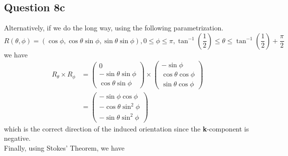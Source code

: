 \documentclass{article}
\begin{document}
\subsection*{Question 8c}
Alternatively, if we do the long way, using the following parametrization.
\[R(\theta, \phi) = (\cos\phi, \cos\theta\sin\phi,\sin\theta\sin\phi), 0\le\phi\le\pi, \tan^{-1}\left(\frac{1}{2}\right)\le\theta\le\tan^{-1}\left(\frac{1}{2}\right)+\frac{\pi}{2}\] we have
\begin{align*}
    R_\theta \times R_\phi &= \begin{pmatrix}0 \\ -\sin\theta\sin\phi \\ \cos\theta\sin\phi\end{pmatrix}\times\begin{pmatrix}-\sin\phi \\ \cos\theta\cos\phi \\ \sin\theta\cos\phi\end{pmatrix}\\
    &= \begin{pmatrix}-\sin\phi\cos\phi \\ -\cos\theta\sin^2\phi \\ -\sin\theta\sin^2\phi\end{pmatrix}
\end{align*}
which is the correct direction of the induced orientation since the \textbf{k}-component is negative.\\
Finally, using Stokes' Theorem, we have
\end{document}
